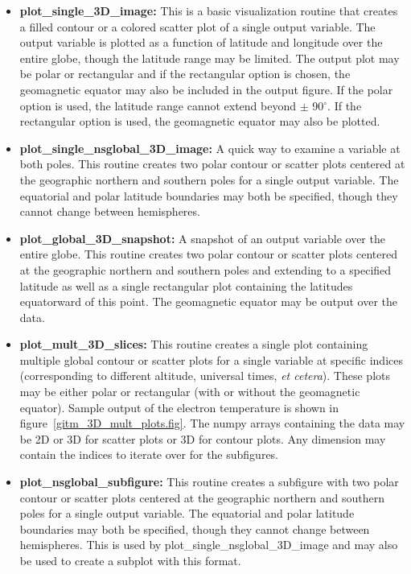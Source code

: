 \begin{itemize}
\item[]{{\bf plot\_single\_3D\_image:}  This is a basic visualization routine that creates a filled contour or a colored scatter plot of a single output variable.  The output variable is plotted as a function of latitude and longitude over the entire globe, though the latitude range may be limited.  The output plot may be polar or rectangular and if the rectangular option is chosen, the geomagnetic equator may also be included in the output figure.  If the polar option is used, the latitude range cannot extend beyond $\pm$ 90$^\circ$.  If the rectangular option is used, the geomagnetic equator may also be plotted.}
\item[]{{\bf plot\_single\_nsglobal\_3D\_image:}  A quick way to examine a variable at both poles.  This routine creates two polar contour or scatter plots centered at the geographic northern and southern poles for a single output variable.  The equatorial and polar latitude boundaries may both be specified, though they cannot change between hemispheres.}
\item[]{{\bf plot\_global\_3D\_snapshot:}  A snapshot of an output variable over the entire globe.  This routine creates two polar contour or scatter plots centered at the geographic northern and southern poles and extending to a specified latitude as well as a single rectangular plot containing the latitudes equatorward of this point.  The geomagnetic equator may be output over the data.}
\item[]{{\bf plot\_mult\_3D\_slices:}  This routine creates a single plot containing multiple global contour or scatter plots for a single variable at specific indices (corresponding to different altitude, universal times, \textit{et cetera}).  These plots may be either polar or rectangular (with or without the geomagnetic equator).  Sample output of the electron temperature is shown in figure~\ref{gitm_3D_mult_plots.fig}.  The numpy arrays containing the data may be 2D or 3D for scatter plots or 3D for contour plots.  Any dimension may contain the indices to iterate over for the subfigures.}
\item[]{{\bf plot\_nsglobal\_subfigure:}  This routine creates a subfigure with two polar contour or scatter plots centered at the geographic northern and southern poles for a single output variable.  The equatorial and polar latitude boundaries may both be specified, though they cannot change between hemispheres.  This is used by plot\_single\_nsglobal\_3D\_image and may also be used to create a subplot with this format.}

\end{itemize}
